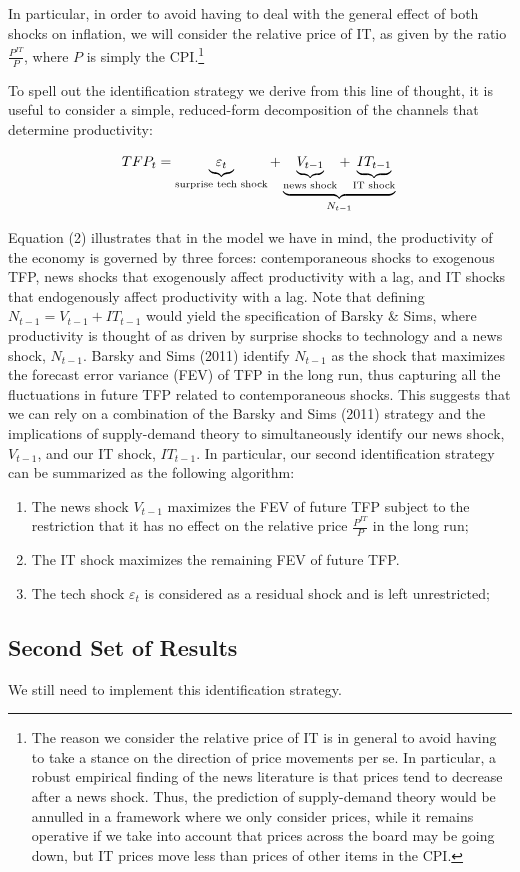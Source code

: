 \documentclass{article}
\begin{document}
In particular, in order to avoid having to deal with the general effect of both shocks on inflation, we will consider the relative price of IT, as given by the ratio $\frac{P^{IT}}{P}$, where $P$ is simply the CPI.\footnote{The reason we consider the relative price of IT is in general to avoid having to take a stance on the direction of price movements per se. In particular, a robust empirical finding of the news literature is that prices tend to decrease after a news shock. Thus, the prediction of supply-demand theory would be annulled in a framework where we only consider prices, while it remains operative if we take into account that prices across the board may be going down, but IT prices move less than prices of other items in the CPI.}

To spell out the identification strategy we derive from this line of thought, it is useful to consider a simple, reduced-form decomposition of the channels that determine productivity:

\begin{equation}
TFP_t =  \underbrace{\varepsilon_t}_\text{surprise tech shock}  + \underbrace{\underbrace{V_{t-1}}_\text{news shock} + \underbrace{IT_{t-1}}_\text{\text{IT shock}}}_\text{$N_{t-1}$}  \\
\end{equation}

Equation (2) illustrates that in the model we have in mind, the productivity of the economy is governed by three forces: contemporaneous shocks to exogenous TFP, news shocks that exogenously affect productivity with a lag, and IT shocks that endogenously affect productivity with a lag. Note that defining $N_{t-1} = V_{t-1} + IT_{t-1}$ would yield the specification of Barsky \& Sims, where productivity is thought of as driven by surprise shocks to technology and a news shock, $N_{t-1}$. Barsky and Sims (2011) identify $N_{t-1}$ as the shock that maximizes the forecast error variance (FEV) of TFP in the long run, thus capturing all the fluctuations in future TFP related to contemporaneous shocks. %
This suggests that we can rely on a combination of the Barsky and Sims (2011) strategy and the implications of supply-demand theory to simultaneously identify our news shock, $V_{t-1}$, and our IT shock, $IT_{t-1}$. In particular, our second identification strategy can be summarized as the following algorithm:

\begin{enumerate}
	\item The news shock $V_{t-1}$ maximizes the FEV of future TFP subject to the restriction that it has no effect on the relative price $\frac{P^{IT}}{P}$ in the long run;
	\item The IT shock maximizes the remaining FEV of future TFP.
    \item The tech shock $\varepsilon_t$ is considered as a residual shock and is left unrestricted;
\end{enumerate}


\subsection{Second Set of Results}

We still need to implement this identification strategy. 
\end{document}
